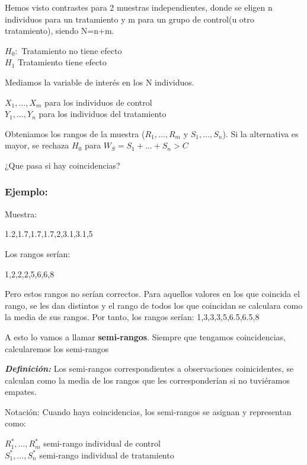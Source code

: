Hemos visto contrastes para 2 muestras independientes, donde se eligen n individuos para un tratamiento y m para un grupo de control(u otro tratamiento), siendo N=n+m.
\begin{center}
    $H_0: $ Tratamiento no tiene efecto \\
    $H_1$ Tratamiento tiene efecto
\end{center}

Mediamos la variable de interés en los N individuos.
\begin{center}
    $X_1,\dots,X_m$ para los individuos de control \\
    $Y_1,\dots,Y_n$ para los individuos del tratamiento
\end{center}

Obteniamos los rangos de la muestra ($R_1,\dots,R_m$ y $S_1,\dots,S_n$).
Si la alternativa es mayor, se rechaza $H_0$ para $W_S=S_1+\dots+S_n>C$

¿Que pasa si hay coincidencias?
\subsubsection*{Ejemplo: }
Muestra: 
\begin{center}
    1.2,1.7,1.7,1.7,2,3.1,3.1,5
\end{center}

Los rangos serían:

\begin{center}
1,2,2,2,5,6,6,8
\end{center}

Pero estos rangos no serían correctos. Para aquellos valores en los que coincida el rango, se les dan distintos y el rango de todos los que coincidan se calculara como la media de sus rangos. Por tanto, los rangos serían:
1,3,3,3,5,6.5,6.5,8

A esto lo vamos a llamar \textbf{semi-rangos}. Siempre que tengamos coincidencias, calcularemos los semi-rangos

\textbf{\textit{Definición: }}Los semi-rangos correspondientes a observaciones coinicidentes, se calculan como la media de los rangos que les corresponderían si no tuviéramos empates.

Notación:
 Cuando haya coincidencias, los semi-rangos se asignan y representan como:
 \begin{center}
    $R_1^*,\dots,R_m^*$ semi-rango individual de control \\
    $S_1^*,\dots,S_n^*$ semi-rango individual de tratamiento
 \end{center}

